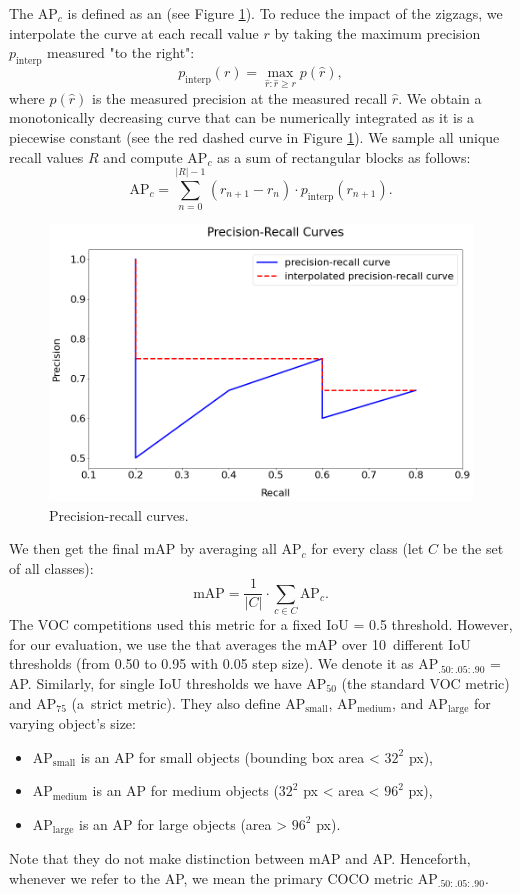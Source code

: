 The AP$_c$ is defined as an  (see Figure \ref{fig:precisionrecall}). To reduce the impact of the zigzags, we interpolate the curve at each recall value $r$ by taking the maximum precision $p_\text{interp}$ measured "to the right":
$$
p_\text{interp}(r) = \max\limits_{\hat{r}:\hat{r} \geq r} p(\hat{r}),
$$
where $p(\hat{r})$ is the measured precision at the measured recall $\hat{r}$. We obtain a monotonically decreasing curve that can be numerically integrated as it is a piecewise constant (see the red dashed curve in Figure \ref{fig:precisionrecall}). We sample all unique recall values $R$ and compute AP$_c$ as a sum of rectangular blocks as follows:
$$
\text{AP}_c = \sum\limits^{\lvert R\rvert - 1}_{n = 0} (r_{n+1} - r_n) \cdot p_\text{interp}(r_{n+1}).
$$

\begin{figure}[H]
    \centering
    \includegraphics[width=0.8\linewidth]{Sources/Figures/precisionrecall.png}
    \caption{Precision-recall curves.}
    \label{fig:precisionrecall}
\end{figure}

We then get the final mAP by averaging all AP$_c$ for every class (let $C$ be the set of all classes):
$$
    \text{mAP} = \frac{1}{\lvert C \rvert} \cdot \sum_{ c\in C} \text{AP}_c.
$$
The VOC competitions \cite{voc} used this metric for a fixed IoU = 0.5 threshold. However, for our evaluation, we use the  \cite{coco} that averages the mAP over 10~different IoU thresholds (from 0.50 to 0.95 with 0.05 step size). We denote it as AP$_{.50:.05:.90}$ = AP. Similarly, for single IoU thresholds we have AP$_{50}$ (the standard VOC metric) and AP$_{75}$ (a~strict metric). They also define AP$_\text{small}$, AP$_\text{medium}$, and AP$_\text{large}$ for varying object's size:
\begin{itemize}
    \item AP$_\text{small}$ is an AP for small objects (bounding box area < $32^2$ px),
    \item AP$_\text{medium}$ is an AP for medium objects ($32^2$ px < area < $96^2$ px),
    \item AP$_\text{large}$ is an AP for large objects (area > $96^2$ px).
\end{itemize}
Note that they do not make distinction between mAP and AP. Henceforth, whenever we refer to the AP, we mean the primary COCO metric AP$_{.50:.05:.90}$. 

